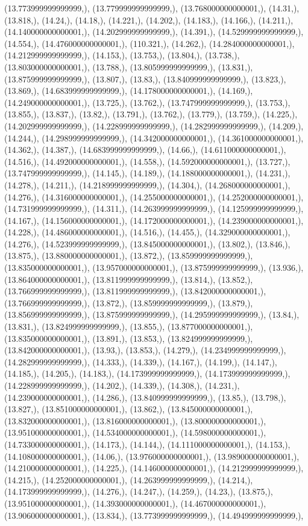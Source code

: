 \documentclass{article}
\begin{document}
(13.773999999999999,), (13.779999999999999,), (13.768000000000001,), (14.31,), (13.818,), (14.24,), (14.18,), (14.221,), (14.202,), (14.183,), (14.166,), (14.211,), (14.140000000000001,), (14.202999999999999,), (14.391,), (14.529999999999999,), (14.554,), (14.476000000000001,), (110.321,), (14.262,), (14.284000000000001,), (14.212999999999999,), (14.153,), (13.753,), (13.804,), (13.738,), (13.803000000000001,), (13.788,), (13.805999999999999,), (13.831,), (13.875999999999999,), (13.807,), (13.83,), (13.840999999999999,), (13.823,), (13.869,), (14.683999999999999,), (14.178000000000001,), (14.169,), (14.249000000000001,), (13.725,), (13.762,), (13.747999999999999,), (13.753,), (13.855,), (13.837,), (13.82,), (13.791,), (13.762,), (13.779,), (13.759,), (14.225,), (14.202999999999999,), (14.228999999999999,), (14.282999999999999,), (14.209,), (14.244,), (14.298999999999999,), (14.342000000000001,), (14.361000000000001,), (14.362,), (14.387,), (14.683999999999999,), (14.66,), (14.611000000000001,), (14.516,), (14.492000000000001,), (14.558,), (14.592000000000001,), (13.727,), (13.747999999999999,), (14.145,), (14.189,), (14.188000000000001,), (14.231,), (14.278,), (14.211,), (14.218999999999999,), (14.304,), (14.268000000000001,), (14.276,), (14.316000000000001,), (14.255000000000001,), (14.252000000000001,), (14.731999999999999,), (14.311,), (14.263999999999999,), (14.125999999999999,), (14.167,), (14.156000000000001,), (14.172000000000001,), (14.239000000000001,), (14.228,), (14.486000000000001,), (14.516,), (14.455,), (14.329000000000001,), (14.276,), (14.523999999999999,), (13.845000000000001,), (13.802,), (13.846,), (13.875,), (13.880000000000001,), (13.872,), (13.859999999999999,), (13.835000000000001,), (13.957000000000001,), (13.875999999999999,), (13.936,), (13.864000000000001,), (13.811999999999999,), (13.814,), (13.852,), (13.766999999999999,), (13.811999999999999,), (13.842000000000001,), (13.766999999999999,), (13.872,), (13.859999999999999,), (13.879,), (13.856999999999999,), (13.875999999999999,), (14.295999999999999,), (13.84,), (13.831,), (13.824999999999999,), (13.855,), (13.877000000000001,), (13.835000000000001,), (13.891,), (13.853,), (13.824999999999999,), (13.842000000000001,), (13.93,), (13.853,), (14.279,), (14.234999999999999,), (14.282999999999999,), (14.333,), (14.339,), (14.167,), (14.199,), (14.147,), (14.185,), (14.205,), (14.183,), (14.173999999999999,), (14.173999999999999,), (14.228999999999999,), (14.202,), (14.339,), (14.308,), (14.231,), (14.239000000000001,), (14.286,), (13.840999999999999,), (13.85,), (13.798,), (13.827,), (13.851000000000001,), (13.862,), (13.845000000000001,), (13.832000000000001,), (13.816000000000001,), (13.800000000000001,), (13.951000000000001,), (14.534000000000001,), (14.598000000000001,), (14.733000000000001,), (14.173,), (14.144,), (14.111000000000001,), (14.153,), (14.108000000000001,), (14.06,), (13.976000000000001,), (13.989000000000001,), (14.210000000000001,), (14.225,), (14.146000000000001,), (14.212999999999999,), (14.215,), (14.252000000000001,), (14.263999999999999,), (14.214,), (14.173999999999999,), (14.276,), (14.247,), (14.259,), (14.23,), (13.875,), (13.951000000000001,), (14.393000000000001,), (14.467000000000001,), (13.906000000000001,), (13.834,), (13.773999999999999,), (14.494999999999999,), 
\end{document}
